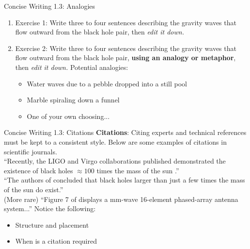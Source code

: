 \documentclass{beamer}
\begin{document}
\begin{frame}{Concise Writing 1.3: Analogies}
\begin{enumerate}
\item Exercise 1: Write three to four sentences describing the gravity waves that flow outward from the black hole pair, then \textit{edit it down.}
\item Exercise 2: Write three to four sentences describing the gravity waves that flow outward from the black hole pair, \textbf{using an analogy or metaphor}, then \textit{edit it down.} Potential analogies:
\begin{itemize}
\item Water waves due to a pebble dropped into a still pool
\item Marble spiraling down a funnel
\item One of your own choosing...
\end{itemize}
\end{enumerate}
\end{frame}

\begin{frame}{Concise Writing 1.3: Citations}
\alert{\textbf{Citations}:} Citing experts and technical references must be kept to a consistent style.  Below are some examples of citations in scientific journals. \\ \vspace{0.25cm}
``Recently, the LIGO and Virgo collaborations published demonstrated the existence of black holes $\approx 100$ times the mass of the sun \cite{10.1103/PhysRevLett.125.101102}.'' \\ \vspace{0.25cm}
``The authors of \cite{10.1103/PhysRevLett.118.221101} concluded that black holes larger than just a few times the mass of the sun do exist.'' \\ \vspace{0.25cm}
(More rare) ``Figure 7 of \cite{10.1109/iwem.2014.6963645} displays a mm-wave 16-element phased-array antenna system...''
Notice the following:
\begin{itemize}
\item Structure and placement
\item When is a citation required
\end{itemize}
\end{frame}
\end{document}

